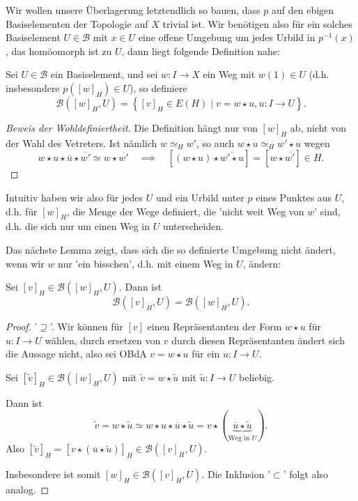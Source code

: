 Wir wollen unsere Überlagerung letztendlich so bauen, dass $p$ auf den ebigen Basiselementen der Topologie auf $X$ trivial ist. Wir benötigen also für ein solches Basiselement  $U\in \mathcal{B}$ mit $x\in U$ eine offene Umgebung um jedes Urbild in $p^{-1} (x)$, das homöomorph ist zu $U$, dann liegt folgende Definition nahe:

\begin{dlemmadef}\label{def:offene-mengen-in-universeller-überlagerung}
    Sei $U\in \mathcal{B}$ ein Basiselement, und sei $w\colon  I \to  X$ ein Weg mit $w(1) \in U$ (d.h. insbesondere $p([w]_H) \in U$), so definiere
\[
    \mathcal{B}([w]_H,U) = \left \{[v]_H \in E(H) \mid v = w \star u, u\colon I\to U\right\}  
.\]
\end{dlemmadef}

\begin{proof}[Beweis der Wohldefiniertheit]
    Die Definition hängt nur von $[w]_H$ ab, nicht von der Wahl des Vetreters. Ist nämlich  $w \simeq_H w'$, so auch  $w \star u \simeq_H w' \star u$ wegen
     \[
         w \star u \star \overline{u} \star \overline{w'} \simeq w \star \overline{w'} \quad \implies\quad [(w \star u) \star\overline{w' \star u}] = [w \star \overline{w'}] \in H
    .\] 
\end{proof}

\begin{remark*}
    Intuitiv haben wir also für jedes $U$ und ein Urbild unter  $p$ eines Punktes aus  $U$, d.h. für  $[w]_H$, die Menge der Wege definiert, die 'nicht weit Weg von  $w$' sind, d.h. die sich nur um einen Weg in  $U$ unterscheiden. 

    Das nächste Lemma zeigt, dass sich die so definierte Umgebung nicht ändert, wenn wir $w$ nur 'ein bisschen', d.h. mit einem Weg in  $U$, ändern:
\end{remark*}

\begin{lemma}\label{lm:b-umgebungen-in-e-h-sind-gleich-für-wege-die-sich-nur-um-weg-in-u-unterscheiden-bzw-invariant-unter-ersetzung-durch-element-der-umgebung}
    Sei $[v]_H\in \mathcal{B}([w]_H,U)$. Dann ist
    \[
        \mathcal{B}([v]_H,U) = \mathcal{B}([w]_H,U)
    .\] 
\end{lemma}

\begin{proof}
    '$\supseteq$'. Wir können für $[v]$ einen Repräsentanten der Form $w \star u$ für  $u\colon  I \to U$ wählen, durch ersetzen von $v$ durch diesen Repräsentanten ändert sich die Aussage nicht, also sei OBdA  $v = w \star u$ für ein  $u\colon  I \to  U$.

    Sei $[\tilde{v}]_H \in \mathcal{B}([w]_H,U)$ mit $\tilde{v} = w \star \tilde{u}$ mit $\tilde{u}\colon  I \to  U$ beliebig.

    Dann ist
    \[
        \tilde{v} = w \star \tilde{u} \simeq w \star u \star \overline{u} \star \tilde{u} = v \star (\underbrace{\overline{u} \star \tilde{u}}_{\text{Weg in $U$}})
    .\] 
    Also $[\tilde{v}]_H = [v \star (\overline{u} \star \tilde{u})]_H \in \mathcal{B}([v]_H, U)$.

    Insbesondere ist somit $[w]_H \in  \mathcal{B}([v]_H, U)$. Die Inklusion '$\subset $' folgt also analog.
\end{proof}

